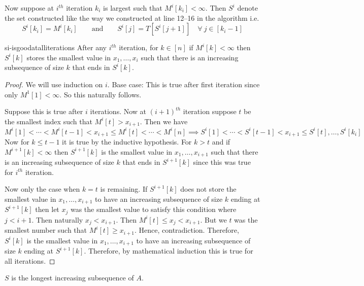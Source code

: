 Now suppose at $i^{th}$ iteration $k_i$ is largest such that $M^i[k_i]<\infty$. Then $S^i$ denote the set constructed like the way we constructed at line 12--16 in the algorithm i.e. $$S^i[k_i]=M^i[k_i]\qquad \text{and}\qquad S^i[j]=T[S^i[j+1]]\quad \forall\ j\in[k_i-1]$$
\begin{lemma}{}{si-isgoodatalliterations}
	After any $i^{th}$ iteration, for $k\in[n]$ if $M^i[k]<\infty$ then $S^i[k]$ stores the smallest value in $x_1,\dots, x_i$ such that there is an increasing subsequence of size $k$ that ends in $S^i[k]$.
\end{lemma}
\begin{proof}
We will use induction on $i$. Base case: This is true after first iteration since only $M^1[1]<\infty$. So this naturally follows. 

Suppose this is true after $i$ iterations.  Now at $(i+1)^{th}$ iteration suppose $t$ be the smallest index such that $M^i[t]>x_{i+1}$. Then we have $$M^i[1]<\cdots< M^i[t-1]<x_{i+1}\leq M^i[t]<\cdots< M^i[n]\implies S^i[1]<\cdots< S^i[t-1]<x_{i+1}\leq S^i[t],\dots, S^i[k_i]$$ Now for $k\leq t-1$ it is true by the inductive hypothesis. For $k>t$ and if $M^{i+1}[k]<\infty$ then $S^{i+1}[k]$ is the smallest value in $x_1,\dots, x_{i+1}$ such that there is an increasing subsequence of size $k$ that ends in $S^{i+1}[k]$ since this was true for $i^{th}$ iteration. 

Now only the case when $k=t$ is remaining. If $S^{i+1}[k]$ does not store the smallest value in $x_1,\dots ,x_{i+1}$ to have an increasing subsequence of size $k$ ending at $S^{i+1}[k]$ then let $x_j$ was the smallest value to satisfy this condition where $j<i+1$. Then naturally $x_j<x_{i+1}$. Then $M^{i}[t]\leq x_j<x_{i+1}$. But we $t$ was the smallest number such that $M^{i}[t]\geq x_{i+1}$. Hence, contradiction. Therefore, $S^i[k]$ is the smallest value in $x_1,\dots, x_{i+1}$ to have an increasing subsequence of size $k$ ending at $S^{i+1}[k]$.  Therefore, by mathematical induction this is true for all iterations. 
\end{proof}
\begin{Theorem}{}{}
	$S$ is the longest increasing subsequence of $A$.
\end{Theorem}
